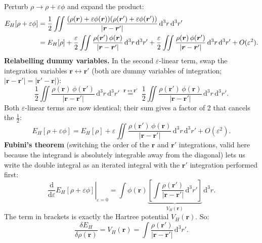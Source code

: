 \documentclass[12pt,letterpaper]{article}
\newcommand{\dd}{\mathrm{d}}
\theoremstyle{definition}
\begin{document}
\begin{derivbox}
Perturb $\rho \to \rho + \varepsilon\phi$ and expand the product:
\begin{align}
  E_H[\rho+\varepsilon\phi]
  &= \frac{1}{2}\iint
    \frac{(\rho(\bm{r})+\varepsilon\phi(\bm{r}))
          (\rho(\bm{r}')+\varepsilon\phi(\bm{r}'))}
         {|\bm{r}-\bm{r}'|}
    \,\dd^3r\,\dd^3r' \notag\\
  &= E_H[\rho]
     + \frac{\varepsilon}{2}\iint
       \frac{\rho(\bm{r}')\,\phi(\bm{r})}{|\bm{r}-\bm{r}'|}
       \,\dd^3r\,\dd^3r'
     + \frac{\varepsilon}{2}\iint
       \frac{\rho(\bm{r})\,\phi(\bm{r}')}{|\bm{r}-\bm{r}'|}
       \,\dd^3r\,\dd^3r'
     + O(\varepsilon^2).
\end{align}
\textbf{Relabelling dummy variables.}
In the second $\varepsilon$-linear term, swap the integration variables
$\bm{r}\leftrightarrow\bm{r}'$ (both are dummy variables of integration;
$|\bm{r}-\bm{r}'|=|\bm{r}'-\bm{r}|$):
\begin{equation}
  \frac{1}{2}\iint\frac{\rho(\bm{r})\,\phi(\bm{r}')}{|\bm{r}-\bm{r}'|}
  \,\dd^3r\,\dd^3r'
  \;\overset{\bm{r}\leftrightarrow\bm{r}'}{=}\;
  \frac{1}{2}\iint\frac{\rho(\bm{r}')\,\phi(\bm{r})}{|\bm{r}-\bm{r}'|}
  \,\dd^3r\,\dd^3r'.
\end{equation}
Both $\varepsilon$-linear terms are now identical; their sum gives a factor
of 2 that cancels the $\tfrac{1}{2}$:
\begin{equation}
  E_H[\rho+\varepsilon\phi]
  = E_H[\rho]
    + \varepsilon\iint
      \frac{\rho(\bm{r}')\,\phi(\bm{r})}{|\bm{r}-\bm{r}'|}
      \,\dd^3r\,\dd^3r'
    + O(\varepsilon^2).
\end{equation}
\textbf{Fubini's theorem} (switching the order of the $\bm{r}$ and $\bm{r}'$
integrations, valid here because the integrand is absolutely integrable away
from the diagonal) lets us write the double integral as an iterated integral
with the $\bm{r}'$ integration performed first:
\begin{equation}
  \left.\frac{\dd}{\dd\varepsilon}E_H[\rho+\varepsilon\phi]\right|_{\varepsilon=0}
  = \int \phi(\bm{r})
    \underbrace{\left[\int\frac{\rho(\bm{r}')}{|\bm{r}-\bm{r}'|}\,\dd^3r'\right]}_{V_H(\bm{r})}
    \,\dd^3r.
\end{equation}
The term in brackets is exactly the Hartree potential $V_H(\bm{r})$. So:
\begin{equation}
  \boxed{\frac{\delta E_H}{\delta\rho(\bm{r})} = V_H(\bm{r})
    = \int\frac{\rho(\bm{r}')}{|\bm{r}-\bm{r}'|}\,\dd^3r'.}
  \label{eq:vh_fd}
\end{equation}
\end{derivbox}
\end{document}
